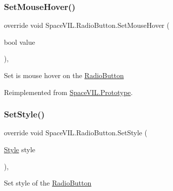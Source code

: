 \mbox{\label{class_space_v_i_l_1_1_radio_button_a5f7fdd3aa50cb94b6ee28e364a058acb}} 
\subsubsection{\texorpdfstring{Set\+Mouse\+Hover()}{SetMouseHover()}}
{\footnotesize\ttfamily override void Space\+V\+I\+L.\+Radio\+Button.\+Set\+Mouse\+Hover (\begin{DoxyParamCaption}\item[{bool}]{value }\end{DoxyParamCaption})\hspace{0.3cm}{\ttfamily [inline]}, {\ttfamily [virtual]}}



Set is mouse hover on the \mbox{\hyperlink{class_space_v_i_l_1_1_radio_button}{Radio\+Button}} 



Reimplemented from \mbox{\hyperlink{class_space_v_i_l_1_1_prototype}{Space\+V\+I\+L.\+Prototype}}.

\mbox{\label{class_space_v_i_l_1_1_radio_button_a35b4ba018fc4af405f853e6628fb5271}} 
\subsubsection{\texorpdfstring{Set\+Style()}{SetStyle()}}
{\footnotesize\ttfamily override void Space\+V\+I\+L.\+Radio\+Button.\+Set\+Style (\begin{DoxyParamCaption}\item[{\mbox{\hyperlink{class_space_v_i_l_1_1_decorations_1_1_style}{Style}}}]{style }\end{DoxyParamCaption})\hspace{0.3cm}{\ttfamily [inline]}, {\ttfamily [virtual]}}



Set style of the \mbox{\hyperlink{class_space_v_i_l_1_1_radio_button}{Radio\+Button}} 



